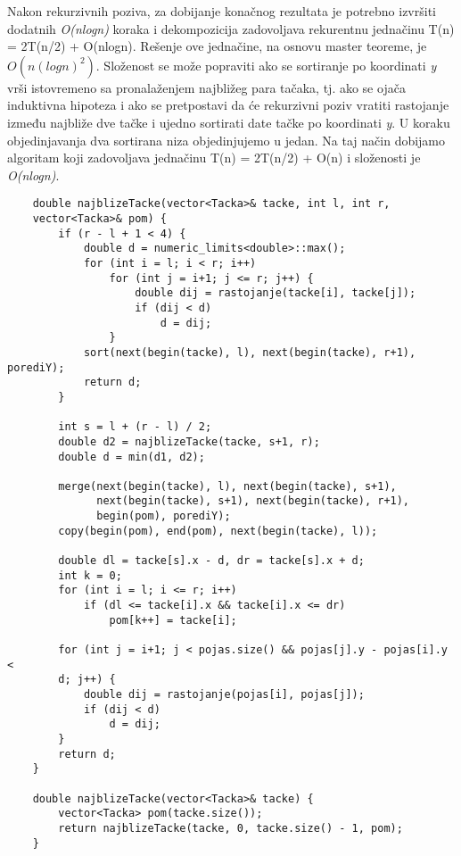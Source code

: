 \documentclass{article}
\begin{document}
Nakon rekurzivnih poziva, za dobijanje konačnog rezultata je potrebno
izvršiti dodatnih \textit{O(nlogn)} koraka i dekompozicija zadovoljava rekurentnu jednačinu T(n) = 2T(n/2) + O(nlogn). Rešenje ove jednačine, na osnovu master teoreme, je $O(n(logn)^2)$.
\newline
Složenost se može popraviti ako se sortiranje po koordinati \textit{y} vrši istovremeno
sa pronalaženjem najbližeg para tačaka, tj. ako se ojača induktivna hipoteza i
ako se pretpostavi da će rekurzivni poziv vratiti rastojanje između najbliže dve
tačke i ujedno sortirati date tačke po koordinati \textit{y}. U koraku objedinjavanja dva
sortirana niza objedinjujemo u jedan. Na taj način dobijamo
algoritam koji zadovoljava jednačinu T(n) = 2T(n/2) + O(n) i složenosti je \textit{O(nlogn)}.
\begin{lstlisting}
    double najblizeTacke(vector<Tacka>& tacke, int l, int r,
    vector<Tacka>& pom) {
        if (r - l + 1 < 4) {
            double d = numeric_limits<double>::max();
            for (int i = l; i < r; i++)
                for (int j = i+1; j <= r; j++) {
                    double dij = rastojanje(tacke[i], tacke[j]);
                    if (dij < d)
                        d = dij;
                }
            sort(next(begin(tacke), l), next(begin(tacke), r+1), porediY);
            return d;
        }

        int s = l + (r - l) / 2;
        double d2 = najblizeTacke(tacke, s+1, r);
        double d = min(d1, d2);
        
        merge(next(begin(tacke), l), next(begin(tacke), s+1),
              next(begin(tacke), s+1), next(begin(tacke), r+1),
              begin(pom), porediY);
        copy(begin(pom), end(pom), next(begin(tacke), l));
        
        double dl = tacke[s].x - d, dr = tacke[s].x + d;
        int k = 0;
        for (int i = l; i <= r; i++)
            if (dl <= tacke[i].x && tacke[i].x <= dr)
                pom[k++] = tacke[i];
        
        for (int j = i+1; j < pojas.size() && pojas[j].y - pojas[i].y <
        d; j++) {
            double dij = rastojanje(pojas[i], pojas[j]);
            if (dij < d)
                d = dij;
        }
        return d;
    }

    double najblizeTacke(vector<Tacka>& tacke) {
        vector<Tacka> pom(tacke.size());
        return najblizeTacke(tacke, 0, tacke.size() - 1, pom);
    }
\end{lstlisting}
\end{document}
